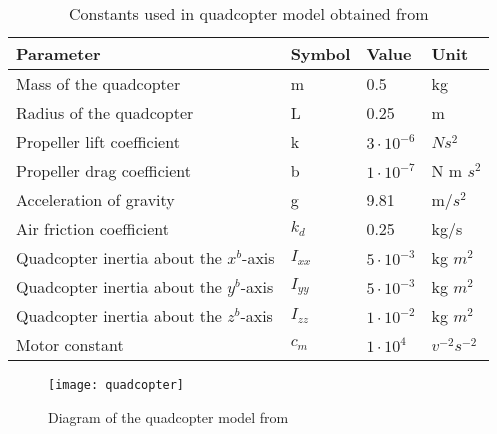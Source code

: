 \begin{table}[]
	\centering
	\caption{Constants used in quadcopter model obtained from \cite{Agudelo}}
	\label{btl:quadcopter model constants}
	\begin{tabular}{|l|l|l|l|}
		\hline
		Parameter                               & Symbol   & Value             & Unit           \\ \hline
		Mass of the quadcopter                  & m        & 0.5               & kg             \\
		Radius of the quadcopter                & L        & 0.25              & m              \\
		Propeller lift coefficient              & k        & $3 \cdot 10^{-6}$ & $Ns^2$        \\
		Propeller drag coefficient              & b        & $1 \cdot 10^{-7}$ & N m $s^2$      \\
		Acceleration of gravity                 & g        & 9.81              & m/$s^2$        \\
		Air friction coefficient                & $k_d$    & 0.25              & kg/s           \\
		Quadcopter inertia about the $x^b$-axis & $I_{xx}$ & $5 \cdot 10^{-3}$ & kg $m^2$       \\
		Quadcopter inertia about the $y^b$-axis & $I_{yy}$ & $5 \cdot 10^{-3}$ & kg $m^2$       \\
		Quadcopter inertia about the $z^b$-axis & $I_{zz}$ & $1 \cdot 10^{-2}$ & kg $m^2$       \\ 
		Motor constant                          & $c_m$    & $1 \cdot 10^{4}$  & $v^{-2}s^{-2}$ \\
		\hline
	\end{tabular}
\end{table}

\begin{figure}[h]
	\centering
	\texttt{[image: quadcopter]}
	\caption{Diagram of the quadcopter model from  \cite{Agudelo}}
	\label{fig:quadcopter model diagram}
\end{figure}


